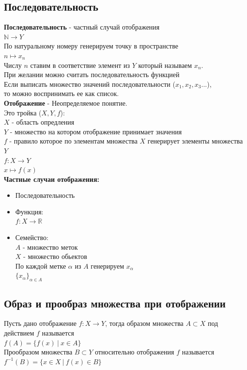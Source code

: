 \subsection{Последовательность}
\textbf{Последовательность} - частный случай отображения\\
$\mathbb{N} \rightarrow Y$\\
По натуральному номеру генерируем точку в пространстве\\
$n \mapsto x_n$\\
Числу $n$ ставим в соответствие элемент из $Y$ который называем $x_n$.\\
\newline
\noindent При желании можно считать последовательность функцией\\
Если выписать множество значений последовательности ($x_1, x_2, x_3...$),\\
то можно воспринимать ее как список.\\
\newline
\textbf{Отображение} - Неопределяемое понятие.\\
Это тройка ($X, Y, f$): \\
$X$ - область опредления\\
$Y$ - множество на котором отображение принимает значения\\
$f$ - правило которое по элементам множества $X$ генерирует элементы множества $Y$\\
$f: X \rightarrow Y$\\
$x \mapsto f(x)$\\
\newline
\textbf{Частные случаи отображения:}
\begin{itemize}
\item Последовательность
\item Функция:\\
$f: X \rightarrow \mathbb{R}$
\item Семейство:\\
$A$ - множество меток\\
$X$ - множество обьектов\\
По каждой метке $\alpha$ из $A$ генерируем $x_\alpha$\\
$\{ x_\alpha \}_{\alpha \in A}$
\end{itemize}

\newpage
\subsection{Образ и прообраз множества при отображении}
Пусть дано отображение $f: X \rightarrow Y$, тогда образом множества $A \subset X$ под действием $f$ называется\\
$f(A) = \{f(x) \ |\ x \in A\}$\\
Прообразом множества $B \subset Y$ относительно отображения $f$ называется\\
$f^{-1}(B) = \{x \in X \ |\ f(x) \in B\}$


